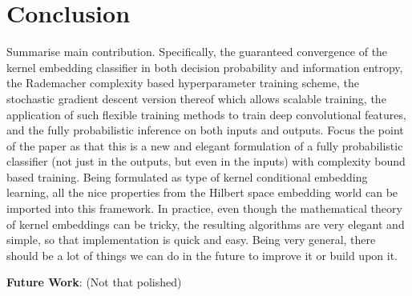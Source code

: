 \documentclass{article}
\newcommand{\note}[1]{{\color{orange} #1}}
\begin{document}
\section{Conclusion}

	\note{Summarise main contribution. Specifically, the guaranteed convergence of the kernel embedding classifier in both decision probability and information entropy, the Rademacher complexity based hyperparameter training scheme, the stochastic gradient descent version thereof which allows scalable training, the application of such flexible training methods to train deep convolutional features, and the fully probabilistic inference on both inputs and outputs. Focus the point of the paper as that this is a new and elegant formulation of a fully probabilistic classifier (not just in the outputs, but even in the inputs) with complexity bound based training. Being formulated as type of kernel conditional embedding learning, all the nice properties from the Hilbert space embedding world can be imported into this framework. In practice, even though the mathematical theory of kernel embeddings can be tricky, the resulting algorithms are very elegant and simple, so that implementation is quick and easy. Being very general, there should be a lot of things we can do in the future to improve it or build upon it.}
	
	\textbf{Future Work}: \note{(Not that polished)}
	
\end{document}
